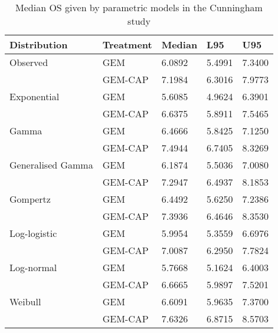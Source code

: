 \begin{table}
    \center
    \begin{tabular}{lllll}
    \hline
    Distribution      & Treatment & Median & L95    & U95    \\ \hline
    Observed          & GEM       & 6.0892 & 5.4991 & 7.3400 \\
                      & GEM-CAP   & 7.1984 & 6.3016 & 7.9773 \\ \hline
    Exponential       & GEM       & 5.6085 & 4.9624 & 6.3901 \\
                      & GEM-CAP   & 6.6375 & 5.8911 & 7.5465 \\
    Gamma             & GEM       & 6.4666 & 5.8425 & 7.1250 \\
                      & GEM-CAP   & 7.4944 & 6.7405 & 8.3269 \\
    Generalised Gamma & GEM       & 6.1874 & 5.5036 & 7.0080 \\
                      & GEM-CAP   & 7.2947 & 6.4937 & 8.1853 \\
    Gompertz          & GEM       & 6.4492 & 5.6250 & 7.2386 \\
                      & GEM-CAP   & 7.3936 & 6.4646 & 8.3530 \\
    Log-logistic      & GEM       & 5.9954 & 5.3559 & 6.6976 \\
                      & GEM-CAP   & 7.0087 & 6.2950 & 7.7824 \\
    Log-normal        & GEM       & 5.7668 & 5.1624 & 6.4003 \\
                      & GEM-CAP   & 6.6665 & 5.9897 & 7.5201 \\
    Weibull           & GEM       & 6.6091 & 5.9635 & 7.3700 \\
                      & GEM-CAP   & 7.6326 & 6.8715 & 8.5703 \\ \hline
    \end{tabular}
    \caption{Median OS given by parametric models in the Cunningham study}
    \label{cunninghamModelMedians}
\end{table}

